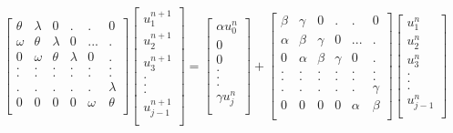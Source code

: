 \documentclass[12pt, oneside]{book}
\theoremstyle{plain}
\theoremstyle{definition}
\begin{document}
$$
\begin{bmatrix}  
\theta & \lambda & 0 & . & . & 0 \\ 
\omega & \theta & \lambda & 0 & ... & . \\ 
0 & \omega & \theta & \lambda & 0 & . \\ 
. & . & .  & . & . & . \\ 
. & . & .  & . & . & . \\ 
. & . & .  & . & . & \lambda \\ 
0 & 0 & 0 & 0 & \omega & \theta \\ 
\end{bmatrix}  \begin{bmatrix} 
u_{1}^{n + 1} \\ 
u_{2}^{n + 1} \\ 
u_{3}^{n + 1} \\ 
.\\ 
.\\ 
.\\ 
u_{j - 1}^{n + 1}\\ 
\end{bmatrix}= \begin{bmatrix}
\alpha u_{0}^{n} \\ 
0 \\ 
0 \\ 
.\\ 
.\\ 
.\\ 
\gamma u_{j}^{n} \\ 
\end{bmatrix}  + \begin{bmatrix}  
\beta & \gamma & 0 & . & . & 0 \\ 
\alpha & \beta & \gamma & 0 & ... & . \\ 
0 & \alpha & \beta & \gamma & 0 & . \\ 
. & . & .  & . & . & . \\ 
. & . & .  & . & . & . \\ 
. & . & .  & . & . & \gamma \\ 
0 & 0 & 0 & 0 & \alpha & \beta \\ 
\end{bmatrix} \begin{bmatrix}  
u_{1}^{n} \\ 
u_{2}^{n} \\ 
u_{3}^{n} \\ 
.\\ 
.\\ 
.\\ 
u_{j - 1}^{n} \\ 
\end{bmatrix}
$$
\end{document}
